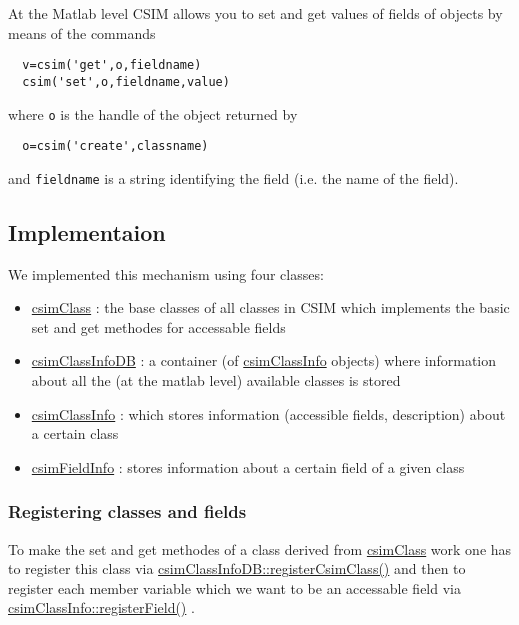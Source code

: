 At the Matlab level CSIM allows you to set and get values of fields of objects by means of the commands



\footnotesize\begin{verbatim}  v=csim('get',o,fieldname)
  csim('set',o,fieldname,value)
\end{verbatim}
\normalsize


where {\tt o} is the handle of the object returned by



\footnotesize\begin{verbatim}  o=csim('create',classname)
\end{verbatim}
\normalsize


and {\tt fieldname} is a string identifying the field (i.e. the name of the field).\hypertarget{fields_fields_implementation}{}\subsection{Implementaion}\label{fields_fields_implementation}
We implemented this mechanism using four classes:

\begin{itemize}
\item \hyperlink{classcsimClass}{csim\-Class} : the base classes of all classes in CSIM which implements the basic set and get methodes for accessable fields\end{itemize}


\begin{itemize}
\item \hyperlink{classcsimClassInfoDB}{csim\-Class\-Info\-DB} : a container (of \hyperlink{classcsimClassInfo}{csim\-Class\-Info} objects) where information about all the (at the matlab level) available classes is stored\end{itemize}


\begin{itemize}
\item \hyperlink{classcsimClassInfo}{csim\-Class\-Info} : which stores information (accessible fields, description) about a certain class\end{itemize}


\begin{itemize}
\item \hyperlink{classcsimFieldInfo}{csim\-Field\-Info} : stores information about a certain field of a given class\end{itemize}
\hypertarget{fields_fields_reg}{}\subsubsection{Registering classes and fields}\label{fields_fields_reg}
To make the set and get methodes of a class derived from \hyperlink{classcsimClass}{csim\-Class} work one has to register this class via \hyperlink{classcsimClassInfoDB_a2}{csim\-Class\-Info\-DB::register\-Csim\-Class()} and then to register each member variable which we want to be an accessable field via \hyperlink{classcsimClassInfo_z1_0}{csim\-Class\-Info::register\-Field()} .

